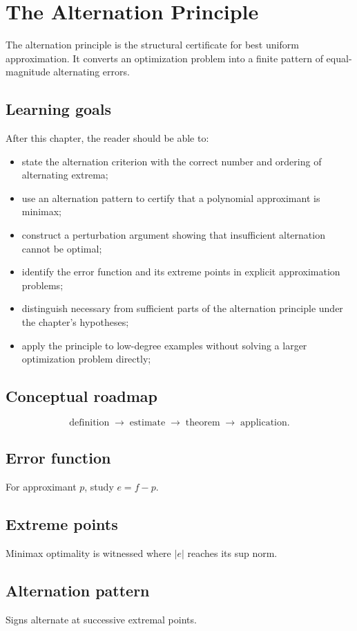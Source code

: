 \chapter{The Alternation Principle}
\label{ch:ii23}

The alternation principle is the structural certificate for best uniform approximation. It converts an optimization problem into a finite pattern of equal-magnitude alternating errors.

\section*{Learning goals}
After this chapter, the reader should be able to:
\begin{itemize}
\item state the alternation criterion with the correct number and ordering of alternating extrema;
\item use an alternation pattern to certify that a polynomial approximant is minimax;
\item construct a perturbation argument showing that insufficient alternation cannot be optimal;
\item identify the error function and its extreme points in explicit approximation problems;
\item distinguish necessary from sufficient parts of the alternation principle under the chapter's hypotheses;
\item apply the principle to low-degree examples without solving a larger optimization problem directly;
\end{itemize}
\section*{Conceptual roadmap}
\[
\boxed{\text{definition}\;\longrightarrow\;\text{estimate}\;\longrightarrow\;\text{theorem}\;\longrightarrow\;\text{application}.}
\]

\section{Error function}
For approximant $p$, study $e=f-p$.

\section{Extreme points}
Minimax optimality is witnessed where $|e|$ reaches its sup norm.

\section{Alternation pattern}
Signs alternate at successive extremal points.


